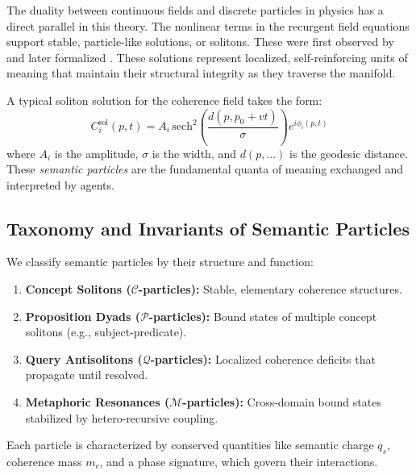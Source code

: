 The duality between continuous fields and discrete particles in physics has a direct parallel in this theory. The nonlinear terms in the recurgent field equations support stable, particle-like solutions, or solitons. These were first observed by \autocite{Russell1845} and later formalized \autocite{KortewegdeVries1895, ZabuskyKruskal1965}. These solutions represent localized, self-reinforcing units of meaning that maintain their structural integrity as they traverse the manifold.

A typical soliton solution for the coherence field takes the form:
\begin{equation}
C_i^{\mathrm{sol}}(p, t) = A_i\, \mathrm{sech}^2\left(\frac{d(p, p_0 + vt)}{\sigma}\right) e^{i\phi_i(p, t)}
\end{equation}
where \(A_i\) is the amplitude, \(\sigma\) is the width, and \(d(p, \dots)\) is the geodesic distance. These \textit{semantic particles} are the fundamental quanta of meaning exchanged and interpreted by agents.


\subsection{Taxonomy and Invariants of Semantic Particles}
\label{sec:taxonomy_and_invariants_of_semantic_particles}

We classify semantic particles by their structure and function:
\begin{enumerate}
    \item \textbf{Concept Solitons (\(\mathcal{C}\)-particles):} Stable, elementary coherence structures.
    \item \textbf{Proposition Dyads (\(\mathcal{P}\)-particles):} Bound states of multiple concept solitons (e.g., subject-predicate).
    \item \textbf{Query Antisolitons (\(\mathcal{Q}\)-particles):} Localized coherence deficits that propagate until resolved.
    \item \textbf{Metaphoric Resonances (\(\mathcal{M}\)-particles):} Cross-domain bound states stabilized by hetero-recursive coupling.
\end{enumerate}
Each particle is characterized by conserved quantities like semantic charge \(q_s\), coherence mass \(m_c\), and a phase signature, which govern their interactions.


